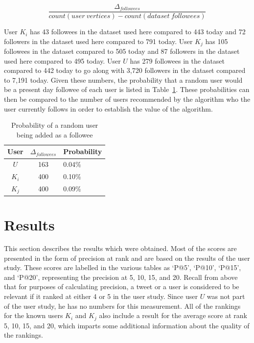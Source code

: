 \begin{center}
\[
\frac{\Delta_{followees} }{count(user\ vertices) - count(dataset\ followees)}
\]
\end{center}


User $K_{i}$ has 43 followees in the dataset used here compared to 443 today and 72 followers in the dataset used here compared to 791 today. User $K_{j}$ has 105 followees in the dataset compared to 505 today and 87 followers in the dataset used here compared to 495 today. User $U$ has 279 followees in the dataset compared to 442 today to go along with 3,720 followers in the dataset compared to 7,191 today. Given these numbers, the probability that a random user would be a present day followee of each user is listed in Table~\ref{tab:RandomUserFolloweeProb}. These probabilities can then be compared to the number of users recommended by the algorithm who the user currently follows in order to establish the value of the algorithm.

\begin{table}
\centering
\begin{tabular}{c|c|l}
{\bf User} & {\bf $\Delta_{followees}$ } & {\bf Probability} \\ \hline
$U$ & 163 &  0.04\%   \\ \hline
$K_{i}$ & 400 & 0.10\% \\ \hline
$K_{j}$ & 400 & 0.09\% \\
\end{tabular}
\caption{Probability of a random user being added as a followee}
\label{tab:RandomUserFolloweeProb}
\end{table}


\section{Results}

This section describes the results which were obtained. Most of the scores are presented in the form of precision at rank and are based on the results of the user study. These scores are labelled in the various tables as `P@5', `P@10', `P@15', and `P@20', representing the precision at 5, 10, 15, and 20. Recall from above that for purposes of calculating precision, a tweet or a user is considered to be relevant if it ranked at either 4 or 5 in the user study. Since user $U$ was not part of the user study, he has no numbers for this measurement. All of the rankings for the known users $K_{i}$ and $K_{j}$ also include a result for the average score at rank 5, 10, 15, and 20, which imparts some additional information about the quality of the rankings.

